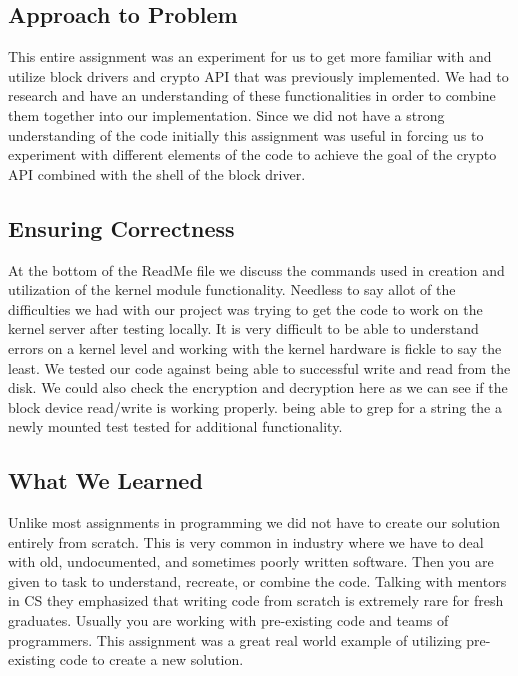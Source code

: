 \documentclass[onecolumn, draftclsnofoot,10pt, compsoc]{IEEEtran}
\begin{document}
\subsection{Approach to Problem}
This entire assignment was an experiment for us to get more familiar with and utilize block drivers and crypto API that was previously implemented. We had to research and have an understanding of these functionalities in order to combine them together into our implementation. Since we did not have a strong understanding of the code initially this assignment was useful in forcing us to experiment with different elements of the code to achieve the goal of the crypto API combined with the shell of the block driver. 
\subsection{Ensuring Correctness}
At the bottom of the ReadMe file we discuss the commands used in creation and utilization of the kernel module functionality. Needless to say allot of the difficulties we had with our project was trying to get the code to work on the kernel server after testing locally. It is very difficult to be able to understand errors on a kernel level and working with the kernel hardware is fickle to say the least. We tested our code against being able to successful write and read from the disk. We could also check the encryption and decryption here as we can see if the block device read/write is working properly. being able to grep for a string the a newly mounted test tested for additional functionality.
\subsection{What We Learned}
Unlike most assignments in programming we did not have to create our solution entirely from scratch. This is very common in industry where we have to deal with old, undocumented, and sometimes poorly written software. Then you are given to task to understand, recreate, or combine the code. Talking with mentors in CS they emphasized that writing code from scratch is extremely rare for fresh graduates. Usually you are working with pre-existing code and teams of programmers. This assignment was a great real world example of utilizing pre-existing code to create a new solution.
\end{document}
